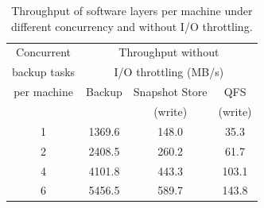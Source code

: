 \begin{table}[t]
  \centering
    \begin{tabular}{|c|ccc|}
\hline
    Concurrent      & \multicolumn{3}{c|}{Throughput without}    \\
    backup tasks            & \multicolumn{3}{c|}{I/O throttling (MB/s)} \\ \cline{2-4}
    per machine                & Backup                                     & Snapshot Store & QFS  \\ 
    		&                                      & (write) & (write)  \\ \hline
    1                       & 1369.6                                     & 148.0          & 35.3 \\
    2                       & 2408.5                                     & 260.2          & 61.7 \\
    4                       & 4101.8                                     & 443.3          & 103.1 \\
    6                       & 5456.5                                     & 589.7          & 143.8 \\ \hline
    \end{tabular}
\caption{Throughput of software layers per machine under different concurrency and without I/O throttling.}
\label{tab:throughput}
\end{table}

